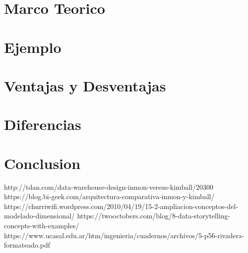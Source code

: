 \documentclass[preprint,12pt]{elsarticle}
\begin{document}
	

\section{Marco Teorico}



\section{Ejemplo}
 
\section{Ventajas y Desventajas}

\section{Diferencias}

\section{Conclusion}


	
	

	
	
	\newpage
	
	   \begin{thebibliography}{0}
                  http://tdan.com/data-warehouse-design-inmon-versus-kimball/20300
                   https://blog.bi-geek.com/arquitectura-comparativa-inmon-y-kimball/
                   https://churriwifi.wordpress.com/2010/04/19/15-2-ampliacion-conceptos-del-modelado-dimensional/
                     https://twooctobers.com/blog/8-data-storytelling-concepts-with-examples/
                   https://www.ucasal.edu.ar/htm/ingenieria/cuadernos/archivos/5-p56-rivadera-formateado.pdf

         \end{thebibliography}
	
\end{document}
